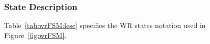 \documentclass[a4paper, 12pt]{article}
\makeatletter
\renewcommand\paragraph{\@startsection{paragraph}{4}{\z@}%
                                     {-3.25ex\@plus -1ex \@minus -.2ex}%
                                     {0.0001pt \@plus .2ex}%
                                     {\normalfont\normalsize\bfseries}}
\makeatother
\begin{document}


\subsubsection{State Description}

Table~\ref{tab:wrFSMdesc} specifies the WR states notation used in Figure~\ref{fig:wrFSM}.

\newpage
\end{document}
